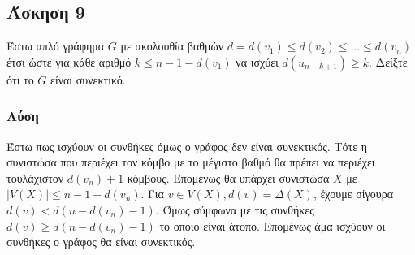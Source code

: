 \newpage\subsection*{Άσκηση 9}

Έστω απλό γράφημα $G$ με ακολουθία βαθμών $d = d(v_1) \le d(v_2) \le ... \le d(v_n)$ έτσι ώστε
για κάθε αριθμό $k \le n - 1 - d(v_1)$ να ισχύει $d(u_{n-k+1}) \ge k$. Δείξτε ότι το $G$ είναι συνεκτικό.

\subsubsection*{Λύση}

Έστω πως ισχύουν οι συνθήκες όμως ο γράφος δεν είναι συνεκτικός. Τότε η συνιστώσα που περιέχει τον κόμβο με το
μέγιστο βαθμό θα πρέπει να περιέχει τουλάχιστον $d(v_n)+1$ κόμβους. Επομένως θα υπάρχει συνιστώσα $X$ με $|V(X)| \le n - 1 - d(v_n)$.
Για $v \in V(X), d(v) = \Delta(X)$, έχουμε σίγουρα $d(v) < d(n-d(v_n)-1)$. Όμως σύμφωνα με τις συνθήκες $d(v) \ge d(n-d(v_n)-1)$ το οποίο είναι άτοπο. 
Επομένως άμα ισχύουν οι συνθήκες ο γράφος θα είναι συνεκτικός.
